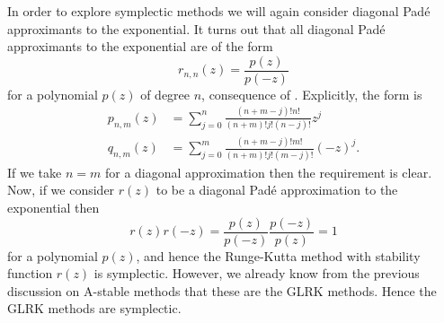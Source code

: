 In order to explore symplectic methods we will again consider diagonal Pad\'e approximants to the exponential.
It turns out that all diagonal Pad\'e approximants to the exponential are of the form
\begin{equation*}
	r_{n,n}(z) = \frac{p(z)}{p(-z)}
\end{equation*}
for a polynomial $p(z)$ of degree $n$, consequence of \cite{hummel1949pade}.
Explicitly, the form is 
\begin{align*}
	p_{n,m}(z) &= \sum_{j=0}^{n}  \frac{(n + m - j)! n!}{(n+m)!j!(n-j)!}z^j \\
	q_{n,m}(z) &= \sum_{j=0}^{m}  \frac{(n + m - j)! m!}{(n+m)!j!(m-j)!}(-z)^j.
\end{align*}
If we take $n=m$ for a diagonal approximation then the requirement is clear.
Now, if we consider $r(z)$ to be a diagonal Pad\'e approximation to the exponential then
\begin{equation*}
	r(z)r(-z) = \frac{p(z)}{p(-z)} \frac{p(-z)}{p(z)} = 1
\end{equation*}
for a polynomial $p(z)$, and hence the Runge-Kutta method with stability function $r(z)$ is symplectic.
However, we already know from the previous discussion on A-stable methods that these are the GLRK methods. 
Hence the GLRK methods are symplectic.

